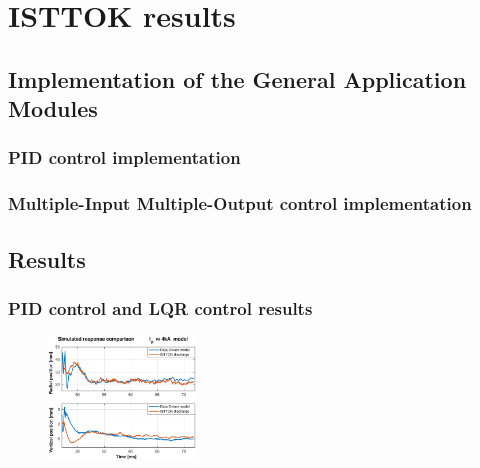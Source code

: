 \chapter{ISTTOK  results }

\section{Implementation of the General Application Modules }
\subsection{PID control implementation}
\subsection{Multiple-Input Multiple-Output control implementation}

\section{Results}
\subsection{PID control and LQR control results}
\begin{figure}
	\centering
	\includegraphics[width=0.35\textwidth]{Chp5/SimResp_559.eps}
\end{figure}